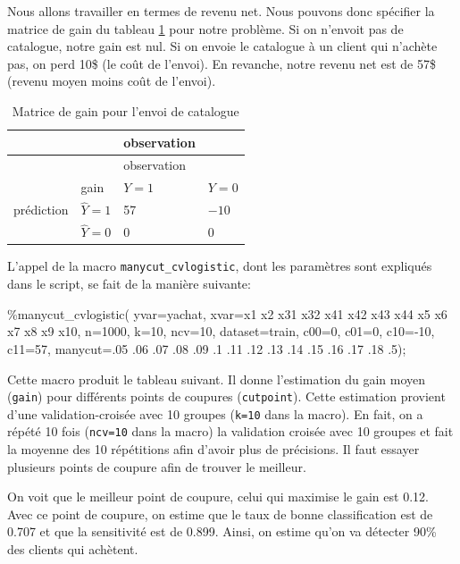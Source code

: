 \documentclass[
  11pt,
  letterpaper,
]{book}
\newenvironment{Shaded}{\begin{snugshade}}{\end{snugshade}}
\newcommand{\NormalTok}[1]{#1}
\theoremstyle{definition}
\theoremstyle{definition}
\theoremstyle{definition}
\theoremstyle{definition}
\theoremstyle{remark}
\begin{document}
Nous allons travailler en termes de revenu net. Nous pouvons donc spécifier la matrice de gain du tableau \ref{tab:03-gain3} pour notre problème. Si on n'envoit pas de catalogue, notre gain est nul. Si on envoie le catalogue à un client qui n'achète pas, on perd 10\$ (le coût de l'envoi). En revanche, notre revenu net est de 57\$ (revenu moyen moins coût de l'envoi).

\begin{longtable}[]{@{}llll@{}}
\caption{\label{tab:03-gain3} Matrice de gain pour l'envoi de catalogue}\tabularnewline
\toprule
& & observation & \\
\midrule
\endfirsthead
\toprule
& & observation & \\
\midrule
\endhead
& gain & \(Y=1\) & \(Y=0\) \\
prédiction & \(\widehat{Y}=1\) & 57 & \(-10\) \\
& \(\widehat{Y}=0\) & 0 & 0 \\
\bottomrule
\end{longtable}

L'appel de la macro \texttt{manycut\_cvlogistic}, dont les paramètres sont expliqués dans le script, se fait de la manière suivante:

\begin{Shaded}
\begin{Highlighting}[]
\NormalTok{\%manycut\_cvlogistic(}
\NormalTok{  yvar=yachat, xvar=x1 x2 x31 x32 }
\NormalTok{  x41 x42 x43 x44 x5 x6 x7 x8 x9 x10,}
\NormalTok{  n=1000, k=10, ncv=10, dataset=train,}
\NormalTok{  c00=0, c01=0, c10={-}10, c11=57,}
\NormalTok{  manycut=.05 .06 .07 .08 .09 .1 .11 .12 .13 .14 .15 .16 .17 .18 .5);}
\end{Highlighting}
\end{Shaded}

Cette macro produit le tableau suivant. Il donne l'estimation du gain moyen (\texttt{gain}) pour différents points de coupures (\texttt{cutpoint}). Cette estimation provient d'une validation-croisée avec 10 groupes (\texttt{k=10} dans la macro). En fait, on a répété 10 fois (\texttt{ncv=10} dans la macro) la validation croisée avec 10 groupes et fait la moyenne des 10 répétitions afin d'avoir plus de précisions. Il faut essayer plusieurs points de coupure afin de trouver le meilleur.

On voit que le meilleur point de coupure, celui qui maximise le gain est 0.12. Avec ce point de coupure, on estime que le taux de bonne classification est de 0.707 et que la sensitivité est de 0.899. Ainsi, on estime qu'on va détecter 90\% des clients qui achètent.
\end{document}
